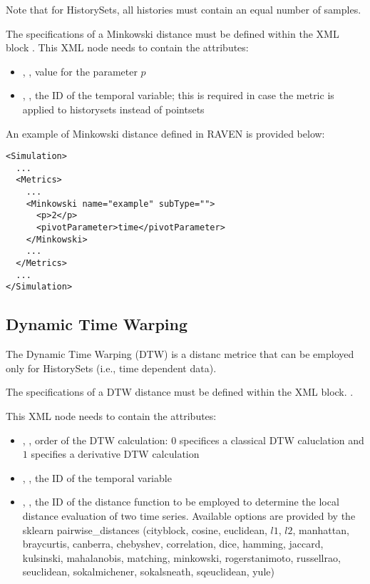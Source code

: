 Note that for HistorySets, all histories must contain an equal number of samples.

The specifications of a Minkowski distance must be defined within the XML block
.
%
This XML node needs to contain the attributes:

\begin{itemize}
  \item {}, , value for the parameter $p$
  \item {}, , the ID of the temporal variable; this is required in case the metric is applied to historysets instead of pointsets
\end{itemize}

An example of Minkowski distance defined in RAVEN is provided below:
\begin{lstlisting}[style=XML]
<Simulation> 
  ...
  <Metrics>
    ...
    <Minkowski name="example" subType="">
      <p>2</p>
      <pivotParameter>time</pivotParameter>
    </Minkowski>
    ...
  </Metrics>
  ...
</Simulation>
\end{lstlisting}


\subsection{Dynamic Time Warping}
\label{subsection:DTW}
The Dynamic Time Warping (DTW) is a distanc metrice that can be employed only for HistorySets (i.e., time dependent data).

The specifications of a DTW distance must be defined within the XML block.
.

This XML node needs to contain the attributes:


\begin{itemize}
  \item {},          ,    order of the DTW calculation: $0$ specifices a classical DTW caluclation and $1$ specifies 
                                                                    a derivative DTW calculation 
  \item {}, , the ID of the temporal variable
  \item {},  , the ID of the distance function to be employed to determine the local distance 
                                                                    evaluation of two time series. Available options are provided by the sklearn 
                                                                    pairwise\_distances (cityblock, cosine, euclidean, $l1$, $l2$, manhattan,
                                                                    braycurtis, canberra, chebyshev, correlation, dice, hamming, jaccard, 
                                                                    kulsinski, mahalanobis, matching, minkowski, rogerstanimoto, russellrao, 
                                                                    seuclidean, sokalmichener, sokalsneath, sqeuclidean, yule)
\end{itemize}

